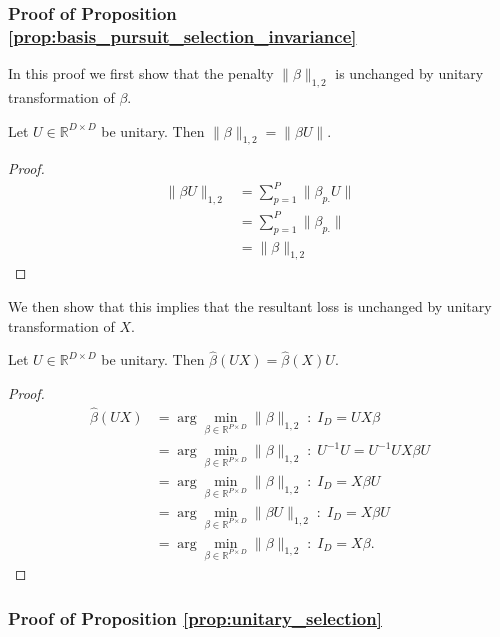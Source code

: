 \subsubsection{Proof of Proposition \ref{prop:basis_pursuit_selection_invariance}}
\label{proof:basis_pursuit_program_invariance}

In this proof we first show that the penalty $\|\beta\|_{1,2}$ is unchanged by unitary transformation of $\beta$.

 \begin{proposition}
 \label{prop:basis_pursuit_loss_equivalence}
 Let $U \in \mathbb R^{D \times D}$ be unitary.
 Then $\|\beta\|_{1,2} = \|\beta U \|$.
\end{proposition}

\begin{proof}
\begin{align}
\|\beta U \|_{1,2} &= \sum_{p = 1}^P \| \beta_{p.} U \| \\
&= \sum_{p = 1}^P \| \beta_{p.} \| \\
&= \|\beta \|_{1,2}
\end{align}
\end{proof}

We then show that this implies that the resultant loss is unchanged by unitary transformation of $ X$.

\begin{proposition}
 \label{prop:basis_pursuit_loss_equivalence}
 Let $U \in \mathbb R^{D \times D}$ be unitary.
 Then $\widehat \beta  (U  X) = \widehat \beta  (  X) U$.
\end{proposition}

\begin{proof}
\begin{align}
\widehat \beta  (U  X)  &= \arg \min_{\beta \in \mathbb R^{P \times D}} \|\beta\|_{1,2}  \; : \; I_{D} = U X \beta \\
&= \arg \min_{\beta \in \mathbb R^{P \times D}} \|\beta\|_{1,2}  \; : \; U^{-1} U = U^{-1} U X \beta U \\
&= \arg \min_{\beta \in \mathbb R^{P \times D}} \|\beta\|_{1,2}  \; : \;  I_D = X \beta U \\
&= \arg \min_{\beta \in \mathbb R^{P \times D}} \|\beta U \|_{1,2}  \; : \;  I_D = X \beta U \\
&= \arg \min_{\beta \in \mathbb R^{P \times D}} \|\beta \|_{1,2}  \; : \;  I_D = X \beta.
\end{align}
\end{proof}

\subsubsection{Proof of Proposition \ref{prop:unitary_selection}}
\label{sec:local_isometry_proof}

